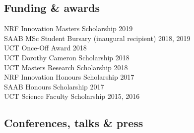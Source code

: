 \documentclass[10pt]{article}
\begin{document}
\begin{multicols}{2} %

\subsection*{Funding \& awards} %

NRF Innovation Masters Scholarship                       \hfill {\small 2019} \\
SAAB MSc Student Bursary {\small (inaugural recipient)}
                                                   \hfill {\small 2018, 2019} \\
UCT Once-Off Award                                 \hfill {\small       2018} \\
UCT Dorothy Cameron Scholarship                    \hfill {\small       2018} \\
UCT Masters Research Scholarship                   \hfill {\small       2018} \\
NRF Innovation Honours Scholarship                 \hfill {\small       2017} \\
SAAB Honours Scholarship                           \hfill {\small       2017} \\
UCT Science Faculty Scholarship                    \hfill {\small 2015, 2016}

\subsection*{Conferences, talks \& press} %


\end{multicols}
\end{document}
